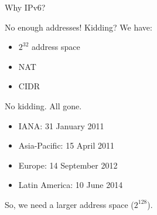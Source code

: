 \begin{frame}{Why IPv6?}
  \begin{block}{No enough addresses!}
    Kidding? We have:
    \begin{itemize}
    \item $2^{32}$ address space
    \item NAT
    \item CIDR
    \end{itemize}
    No kidding. All gone.
    \begin{itemize}
    \item IANA: 31 January 2011
    \item Asia-Pacific: 15 April 2011
    \item Europe: 14 September 2012
    \item Latin America: 10 June 2014
    \end{itemize}
  \end{block}
  So, we need a larger address space ($2^{128}$).
\end{frame}

